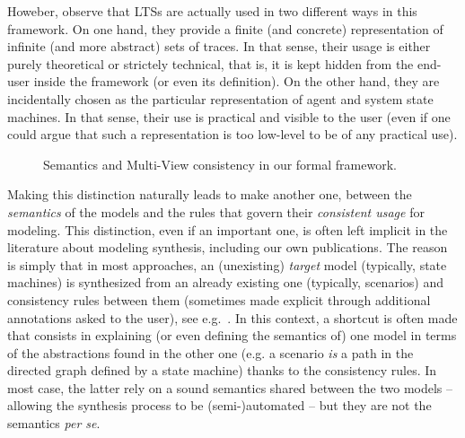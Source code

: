 Howeber, observe that LTSs are actually used in two different ways in this framework. On one hand, they provide a finite (and concrete) representation of infinite (and more abstract) sets of traces. In that sense, their usage is either purely theoretical or strictely technical, that is, it is kept hidden from the end-user inside the framework (or even its definition). On the other hand, they are incidentally chosen as the particular representation of agent and system state machines. In that sense, their use is practical and visible to the user (even if one could argue that such a representation is too low-level to be of any practical use). 

\begin{figure}[t]\centering
{}
\caption{Semantics and Multi-View consistency in our formal framework.\label{image:framework}}
\end{figure}

Making this distinction naturally leads to make another one, between the \emph{semantics} of the models and the rules that govern their \emph{consistent usage} for modeling. This distinction, even if an important one, is often left implicit in the literature about modeling synthesis, including our own publications. The reason is simply that in most approaches, an (unexisting) \emph{target} model (typically, state machines) is synthesized from an already existing one (typically, scenarios) and consistency rules between them (sometimes made explicit through additional annotations asked to the user), see e.g.~\cite{Uchitel:2003, Damas:2005, Whittle:2000}. In this context, a shortcut is often made that consists in explaining (or even defining the semantics of) one model in terms of the abstractions found in the other one (e.g. a scenario \emph{is} a path in the directed graph defined by a state machine) thanks to the consistency rules. In most case, the latter rely on a sound semantics shared between the two models -- allowing the synthesis process to be (semi-)automated -- but they are not the semantics \emph{per se}. 

